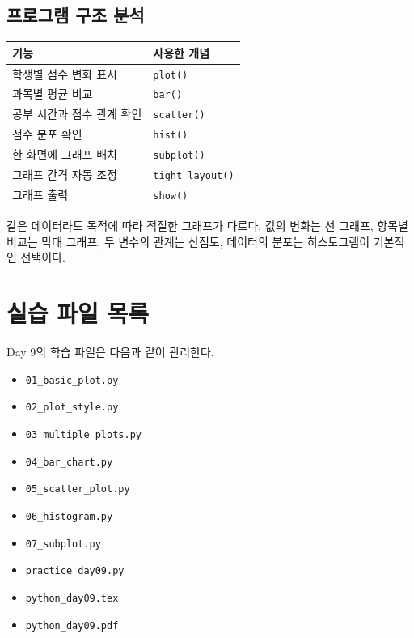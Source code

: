 \documentclass[11pt,a4paper]{article}
\begin{document}
\subsection{프로그램 구조 분석}

\begin{center}
\begin{tabular}{ll}
\toprule
기능 & 사용한 개념 \\
\midrule
학생별 점수 변화 표시 & \texttt{plot()} \\
과목별 평균 비교 & \texttt{bar()} \\
공부 시간과 점수 관계 확인 & \texttt{scatter()} \\
점수 분포 확인 & \texttt{hist()} \\
한 화면에 그래프 배치 & \texttt{subplot()} \\
그래프 간격 자동 조정 & \texttt{tight\_layout()} \\
그래프 출력 & \texttt{show()} \\
\bottomrule
\end{tabular}
\end{center}

\begin{importantbox}
같은 데이터라도 목적에 따라 적절한 그래프가 다르다. 값의 변화는 선 그래프, 항목별 비교는 막대 그래프, 두 변수의 관계는 산점도, 데이터의 분포는 히스토그램이 기본적인 선택이다.
\end{importantbox}

\section{실습 파일 목록}

\begin{practicebox}
Day 9의 학습 파일은 다음과 같이 관리한다.
\begin{itemize}[leftmargin=1.5em]
    \item \texttt{01\_basic\_plot.py}
    \item \texttt{02\_plot\_style.py}
    \item \texttt{03\_multiple\_plots.py}
    \item \texttt{04\_bar\_chart.py}
    \item \texttt{05\_scatter\_plot.py}
    \item \texttt{06\_histogram.py}
    \item \texttt{07\_subplot.py}
    \item \texttt{practice\_day09.py}
    \item \texttt{python\_day09.tex}
    \item \texttt{python\_day09.pdf}
\end{itemize}
\end{practicebox}
\end{document}
